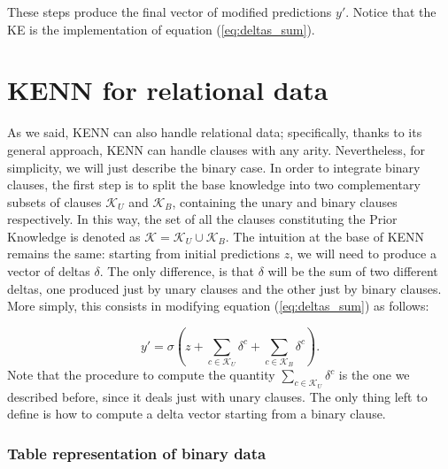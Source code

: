  These steps produce the final vector of modified predictions $y'$. Notice that the KE is the implementation of equation (\ref{eq:deltas_sum}).
 
 \section{KENN for relational data}
 \label{sec:relational_kenn}
 
 As we said, KENN can also handle relational data; specifically, thanks to its general approach, KENN can handle clauses with any arity. Nevertheless, for simplicity, we will just describe the binary case. In order to integrate binary clauses, the first step is to split the base knowledge into two complementary subsets of clauses $\mathcal{K}_U$ and $\mathcal{K}_B$, containing the unary and binary clauses respectively. In this way, the set of all the clauses constituting the Prior Knowledge is denoted as \mbox{$\mathcal{K} = \mathcal{K}_U \cup \mathcal{K}_B$}. The intuition at the base of KENN remains the same: starting from initial predictions $z$, we will need to produce a vector of deltas $\delta$. The only difference, is that $\delta$ will be the sum of two different deltas, one produced just by unary clauses and the other just by binary clauses. More simply, this consists in modifying equation (\ref{eq:deltas_sum}) as follows:
 
 \begin{equation}
 \label{eq:binary_kenn_eq}
 y'=\sigma(z + \sum_{c\in\mathcal{K}_U}\delta^c + \sum_{c\in\mathcal{K}_B}\delta^c).
 \end{equation}
Note that the procedure to compute the quantity $\sum_{c\in \mathcal{K}_U}\delta^c$ is the one we described before, since it deals just with unary clauses. The only thing left to define is how to compute a delta vector starting from a binary clause. 

\subsubsection{Table representation of binary data}

